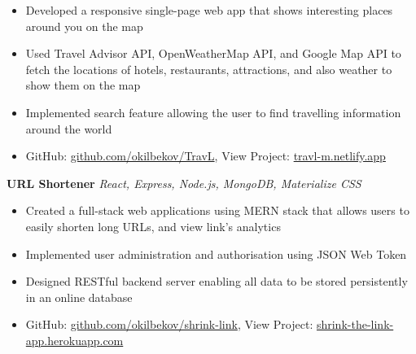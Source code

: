 \documentclass[a4paper]{article}
\begin{document}
\vspace{-2mm}
\begin{itemize} \itemsep 1pt
	\item Developed a responsive single-page web app that shows interesting places around you on the map
	\vspace{-2mm}
	\item Used Travel Advisor API, OpenWeatherMap API, and Google Map API to fetch the locations of hotels, restaurants, attractions, and also weather to show them on the map
	\vspace{-2mm}
	\item Implemented search feature allowing the user to find travelling information around the world
	\vspace{-2mm}
	\item GitHub: \href{https://github.com/okilbekov/TravL}{github.com/okilbekov/TravL}, View Project: \href{https://travl-m.netlify.app}{travl-m.netlify.app}
\end{itemize}
{\textbf{URL Shortener}} {\sl React, Express, Node.js, MongoDB, Materialize CSS} \\
\vspace{-2mm}
\begin{itemize} \itemsep 1pt
	\item Created a full-stack web applications using MERN stack that allows users to easily shorten long URLs, and view link's analytics
	\vspace{-2mm}
	\item Implemented user administration and authorisation using JSON Web Token
	\vspace{-2mm}
	\item Designed RESTful backend server enabling all data to be stored persistently in an online database
	\vspace{-2mm}
	\item GitHub: \href{https://github.com/okilbekov/shrink-link}{github.com/okilbekov/shrink-link}, View Project: \href{https://shrink-the-link-app.herokuapp.com}{shrink-the-link-app.herokuapp.com}
\end{itemize}
\end{document}

